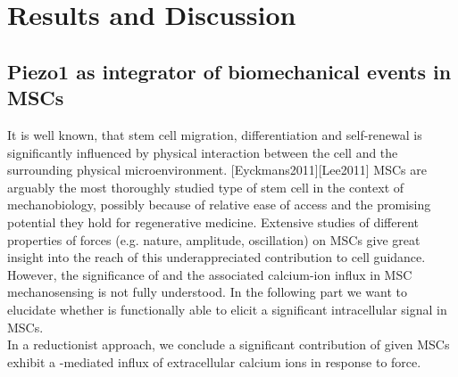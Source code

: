 \chapter{Results and Discussion}

\section{Piezo1 as integrator of biomechanical events in MSCs}

It is well known, that stem cell migration, differentiation and self-renewal is significantly influenced by physical interaction between the cell and the surrounding physical microenvironment. [Eyckmans2011][Lee2011] MSCs are arguably the most thoroughly studied type of stem cell in the context of mechanobiology, possibly because of relative ease of access and the promising potential they hold for regenerative medicine. Extensive studies of different properties of forces (e.g. nature, amplitude, oscillation) on MSCs give great insight into the reach of this underappreciated contribution to cell guidance. However, the significance of \Piezo{} and the associated calcium-ion influx in MSC mechanosensing is not fully understood. In the following part we want to elucidate whether \Piezo{} is functionally able to elicit a significant intracellular signal in MSCs.\\
In a reductionist approach, we conclude a significant contribution of \Piezo{} given MSCs exhibit a \Piezo{}-mediated influx of extracellular calcium ions in response to force. \\
